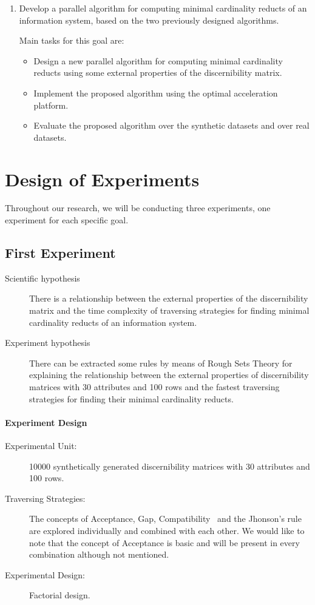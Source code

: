 \documentclass[11pt]{article}   %
\begin{document}
\begin{enumerate}
  \item Develop a parallel algorithm for computing minimal cardinality reducts of an information system, based 
  		on the two previously designed algorithms.
  		
  		Main tasks for this goal are:
  		\begin{itemize}
  		\item Design a new parallel algorithm for computing minimal cardinality reducts using some external
  		      properties of the discernibility matrix.
  		\item Implement the proposed algorithm using the optimal acceleration platform.
  		\item Evaluate the proposed algorithm over the synthetic datasets and over real datasets.
  		\end{itemize}
  \end{enumerate}

\section{Design of Experiments}\label{DOE}
  Throughout our research, we will be conducting three experiments, one experiment for each specific goal.
  
\subsection{First Experiment}
  \begin{description}
  \item[Scientific hypothesis] There is a relationship between the external properties of the discernibility 
  							   matrix and the time complexity of traversing strategies for finding minimal
  							   cardinality reducts of an information	system.
  \item[Experiment hypothesis] There can be extracted some rules by means of Rough Sets Theory for explaining
  							   the relationship between the external properties of discernibility matrices
  							   with 30 attributes and 100 rows and the fastest traversing strategies for finding
  							   their minimal cardinality reducts.  
  \end{description}
  \paragraph{Experiment Design} 
	  \begin{description}
	  	\item[Experimental Unit:] 10000 synthetically generated discernibility matrices with 30 attributes and
	  							  100 rows.
	  	\item[Traversing Strategies:] The concepts of Acceptance, Gap, Compatibility~\cite{Lias13} and the 
	  								  Jhonson's rule~\cite{Ohrn00} are explored individually and combined with 
	  								  each other. We would like to note that the concept of Acceptance is basic
	  								  and will be present in every combination although not mentioned.
	  	\item[Experimental Design:] Factorial design.
	  \end{description}
\end{document}
